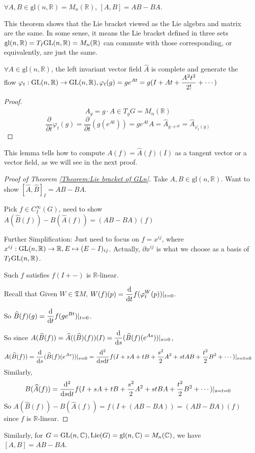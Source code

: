 \begin{theorem}\label{Theorem:Lie bracket of GLn}
     $ \forall A,B\in\mathrm{gl}(n,\mathbb{R})=M_n(\mathbb{R}) $,  $ [A,B]=AB-BA $.  
\end{theorem}
\begin{remark}
    This theorem shows that the Lie bracket viewed as the Lie algebra and matrix are the same. In some sense, it means the Lie bracket defined in three sets  $ \mathrm{gl}(n,\mathbb{R})=T_I\mathrm{GL}(n,\mathbb
    R)=M_n(\mathbb{R}) $ can commute with those corresponding, or equivalently, are just the same. 
\end{remark}
\begin{lemma}
     $ \forall A\in \mathrm{gl}(n,\mathbb{R}) $, the left invariant vector field  $ \hat{A} $ is complete and generate the flow  $ \displaystyle\varphi_t:\mathrm{GL}(n,\mathbb{R})\rightarrow \mathrm{GL}(n,\mathbb{R}), \varphi_t(g)=ge^{At}=g(I+At+\frac{A^2t^2}{2!}+\cdots) $   
\end{lemma}
\begin{proof}
     \[\hat{A}_g=g\cdot A\in T_gG=M_n(\mathbb{R})\]
      \[\frac{\partial}{\partial t}\varphi_t(g)=\frac{\partial}{\partial t}(g(e^{At}))=ge^{At}A=\hat{A}_{g\cdot e^{At}}=\hat{A}_{\varphi_t(g)}\]
\end{proof}
\begin{remark}
     This lemma tells how to compute  $ A(f)=\hat{A}(f)(I) $ as a tangent vector or a vector field, as we will see in the next proof. 
\end{remark}
\begin{proof}[Proof of Theorem \ref{Theorem:Lie bracket of GLn}]
    Take  $ A,B\in \mathrm{gl}(n,\mathbb{R}) $. Want to show  $ [\hat{A},\hat{B}]_I=AB-BA $.
    
    Pick  $ f\in C^\infty_I(G) $, need to show  $ A(\hat{B}(f))-B(\hat{A}(f))=(AB-BA)(f) $
    
    Further Simplification: Just need to focus on  $ f=x^{ij} $, where  $ x^{ij}:\mathrm{GL}(n,\mathbb{R})\rightarrow \mathbb{R}, E\mapsto (E-I)_{ij} $. Actually,  $ \partial x^{ij} $ is what we choose as a basis of  $ T_I\mathrm{GL}(n,\mathbb{R}) $.  
    
    Such  $ f $ satisfies  $ f(I+-) $ is  $ \mathbb{R} $-linear.
    
    Recall that Given  $ W\in \mathfrak{T}M $,  $ W(f)(p)=\displaystyle\frac{\mathrm{d}}{\mathrm{d}t}f(\varphi_t^W(p))|_{t=0} $. 
    
    So  $ \widehat{B}(f)(g)=\displaystyle\frac{\mathrm{d}}{\mathrm{d}t}f(ge^{Bt})|_{t=0} $.
    
    So  since  $ A(\widehat{B}(f))=\widehat{A}((\widehat{B})(f))(I)=\displaystyle \frac{\mathrm{d}}{\mathrm{d}s}(\widehat{B}(f)(e^{As}))|_{s=0}  $, 
    \[\displaystyle A(\widehat{B}(f)) =\frac{\mathrm{d}}{\mathrm{d}s}(\widehat{B}(f)(e^{As}))|_{s=0}=\frac{\mathrm{d}^2}{\mathrm{d}s\mathrm{d}t}f(I+sA+tB+\frac{s^2}{2}A^2+stAB+\frac{t^2}{2}B^2+\cdots)|_{s=t=0}\]
    Similarly,
    \[\displaystyle B(\widehat{A}(f))=\frac{\mathrm{d}^2}{\mathrm{d}s\mathrm{d}t}f(I+sA+tB+\frac{s^2}{2}A^2+stBA+\frac{t^2}{2}B^2+\cdots)|_{s=t=0}\]
    So $ A(\hat{B}(f))-B(\hat{A}(f))=f(I+(AB-BA))=(AB-BA)(f) $ since  $ f $ is  $ \mathbb{R} $-linear.  
\end{proof}
Similarly, for  $ G=\mathrm{GL}(n,\mathbb{C}), \mathrm{Lie}(G)=\mathrm{gl}(n,\mathbb{C})=M_n(\mathbb{C}) $, we have  $ [A,B]=AB-BA $.
  
